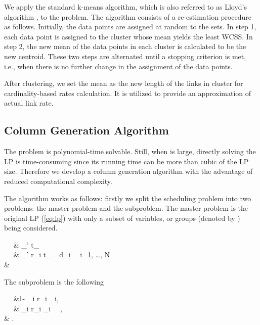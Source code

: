 \documentclass[10pt,onecolumn,journal,draftcls,oneside]{IEEEtran}
\newcommand{\CN}{\mathcal{N}}
\newcommand{\CH}{\mathcal{H}}
\newcommand{\Cc}{\mathpzc{c}}
\newcommand{\Bt}{\boldsymbol{t}}
\newcommand{\Bpi}{\boldsymbol{\pi}}
\begin{document}
We apply the standard k-means algorithm, which is also referred to as Lloyd's algorithm \cite{Md03}, to the problem. The algorithm consists of a re-estimation procedure as follows. Initially, the data points are assigned at random to the  sets. In step 1, each data point  is assigned to the cluster whose mean yields the least WCSS. In step 2, the new mean of the data points in each cluster is calculated to be the new centroid. These two steps are alternated until a stopping criterion is met, i.e., when there is no further change in the assignment of the data points. 

After clustering, we set the mean  as the new length of the links in cluster  for cardinality-based rates calculation. It is utilized to provide an approximation of actual link rate.

\subsection{Column Generation Algorithm}
The problem  is polynomial-time solvable. Still, when  is large, directly solving the LP is time-consuming since its running time can be more than cubic of the LP size. Therefore we develop a column generation algorithm with the advantage of reduced computational complexity.

The algorithm works as follows: firstly we split the scheduling problem into two problems: the master problem and the subproblem. The master problem is the original LP (\ref{eq:lp}) with only a subset of variables, or groups (denoted by ) being considered.


\min~~ & \sum_{\Cc \in \CH'} t_\Cc \label{eq:cgo}\\
~~ & \sum_{\Cc \in \CH'} r_{i\Cc} t_\Cc = d_i ~~i=1, \dots, N \label{eq:cgcons} \\
& \Bt {}


The subproblem is the following 

\min~~ &1- \sum_{i \in \CN} r_{i\Cc} \pi_i, \label{eq:rco}\\
~~ & \sum_{i \in \Cc} r_{i\Cc} \pi_i ~~\Cc \in \CH, \label{eq:rcc} \\
& \Bpi {}.
\end{document}
